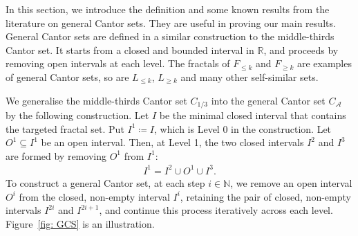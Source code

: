 \documentclass{ws-ijnt}
\begin{document}
	In this section, we introduce the definition and some known results from the literature on general Cantor sets. They are useful in proving our main results. General Cantor sets are defined in a similar construction to the middle-thirds Cantor set. It starts from a closed and bounded interval in $\mathbb{R}$, and proceeds by removing open intervals at each level. The fractals of $F_{\leq k}$ and $F_{\geq k}$ are examples of general Cantor sets, so are $L_{\leq k}$, $L_{\geq k}$ and many other self-similar sets.
	
	We generalise the middle-thirds Cantor set $C_{1/3}$ into the general Cantor set $C_{\mathcal{A}}$ by the following construction. Let $I$ be the minimal closed interval that contains the targeted fractal set. Put $I^1\coloneqq I$, which is Level 0 in the construction. Let $O^1\subseteq I^1$ be an open interval. Then, at Level 1, the two closed intervals $I^2$ and $I^3$ are formed by removing $O^1$ from $I^1$:
	\begin{align*}
		I^1
		= I^2 \cup O^1 \cup I^3.
	\end{align*}
	To construct a general Cantor set, at each step $i\in\mathbb{N}$, we remove an open interval $O^i$ from the closed, non-empty interval $I^i$, retaining the pair of closed, non-empty intervals $I^{2i}$ and $I^{2i+1}$, and continue this process iteratively across each level.
	Figure~\ref{fig: GCS} is an illustration.
\end{document}
